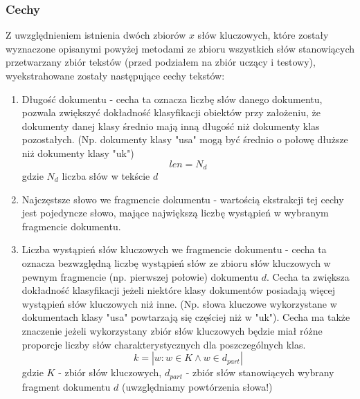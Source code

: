\documentclass{classrep}
\begin{document}
{{            \subsubsection{Cechy} {
                Z uwzględnieniem istnienia dwóch zbiorów $x$ słów kluczowych, które zostały wyznaczone opisanymi powyżej metodami
                ze zbioru wszystkich słów stanowiących przetwarzany zbiór tekstów (przed podziałem na zbiór uczący i testowy),
                wyekstrahowane zostały następujące cechy tekstów:
                \begin{enumerate}
                    \item Długość dokumentu - cecha ta oznacza liczbę słów danego dokumentu, pozwala zwiększyć dokładność
                    klasyfikacji obiektów przy założeniu, że dokumenty danej klasy średnio mają inną długość niż dokumenty klas pozostałych.
                    (Np. dokumenty klasy "usa" mogą być średnio o połowę dłuższe niż dokumenty klasy "uk")
                    \begin{equation}
                        len = N_{d}
                    \end{equation}
                    gdzie $N_{d}$ liczba słów w tekście $d$

                    \item Najczęstsze słowo we fragmencie dokumentu - wartością ekstrakcji tej cechy jest pojedyncze słowo, mające największą liczbę
                    wystąpień w wybranym fragmencie dokumentu.

                    \item Liczba wystąpień słów kluczowych we fragmencie dokumentu - cecha ta oznacza bezwzględną liczbę wystąpień słów ze zbioru słów kluczowych
                    w pewnym fragmencie (np. pierwszej połowie) dokumentu $d$. Cecha ta zwiększa dokładność klasyfikacji jeżeli niektóre klasy dokumentów
                    posiadają więcej wystąpień słów kluczowych niż inne. (Np. słowa kluczowe wykorzystane w dokumentach klasy "usa" powtarzają się częściej
                    niż w "uk"). Cecha ma także znaczenie jeżeli wykorzystany zbiór słów kluczowych będzie miał różne proporcje liczby słów charakterystycznych
                    dla poszczególnych klas.
                    \begin{equation}
                        k = |{w: w \in K \land w \in d_{part}}|
                    \end{equation}
                    gdzie $K$ - zbiór słów kluczowych, $d_{part}$ - zbiór słów stanowiących wybrany fragment dokumentu $d$ (uwzględniamy powtórzenia słowa!)


\end{enumerate}}}}
\end{document}
